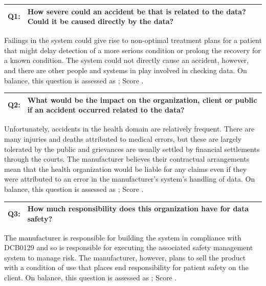 \addtocounter{table}{-1} %
\begin{longtable*}[H]
	{|L{}|L{}|}
	\hline
	Q1: & How severe could an accident be that is related to the data? Could it be caused directly by the data?\\
	\hline
\end{longtable*}

Failings in the system could give rise to non-optimal treatment plans for a patient that might delay detection of a more serious condition or prolong the recovery for a known condition. The system could not directly cause an accident, however, and there are other people and systems in play involved in checking data. On balance, this question is assessed as ; Score .

\addtocounter{table}{-1} %
\begin{longtable*}[H]
	{|L{}|L{}|}
	\hline
	Q2: & What would be the impact on the organization, client or public if an accident occurred related to the data?\\
	\hline
\end{longtable*}

Unfortunately, accidents in the health domain are relatively frequent. There are many injuries and deaths attributed to medical errors, but these are largely tolerated by the public and grievances are usually settled  by financial settlements through the courts. The manufacturer believes their contractual arrangements mean that the health organization would be liable for any claims even if they were attributed to an error in the manufacturer's system's handling of data. On balance, this question is assessed as ; Score .

\addtocounter{table}{-1} %
\begin{longtable*}[H]
	{|L{}|L{}|}
	\hline
	Q3: & How much responsibility does this organization have for data safety?\\
	\hline
\end{longtable*}

The manufacturer is responsible for building the system in compliance with
DCB0129 \cite{citation:dcb0129clinical}
and so is responsible for executing the associated safety management system to manage risk. The manufacturer, however, plans to sell the product with a condition of use that places end responsibility for patient safety on the client. On balance, this question is assessed as ; Score .

